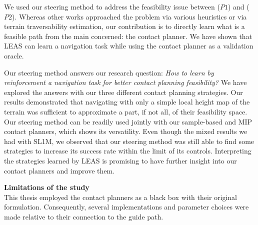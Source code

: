 We used our steering method to address the feasibility issue between ($P1$) and ($P2$).
Whereas other works approached the problem via various heuristics or via terrain traversability estimation, our contribution is to directly learn what is a feasible path from the main concerned: the contact planner.
We have shown that LEAS can learn a navigation task while using the contact planner as a validation oracle.



Our steering method answers our research question: \textit{How to learn by reinforcement a navigation task for better contact planning feasibility?}
We have explored the answers with our three different contact planning strategies.
Our results demonstrated that navigating with only a simple local height map of the terrain was sufficient to approximate a part, if not all, of their feasibility space.
Our steering method can be readily used jointly with our sample-based and MIP contact planners, which shows its versatility. 
Even though the mixed results we had with SL1M, we observed that our steering method was still able to find some strategies to increase its success rate within the limit of its controls.
Interpreting the strategies learned by LEAS is promising to have further insight into our contact planners and improve them.


\hfill \break
\hfill \break

\noindent\textbf{Limitations of the study}\\

This thesis employed the contact planners as a black box with their original formulation. Consequently, several implementations and parameter choices were made relative to their connection to the guide path.

